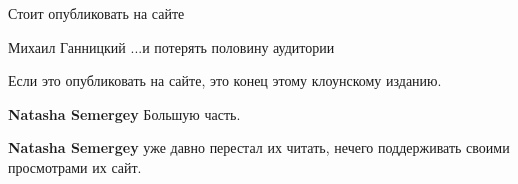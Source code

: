\begin{itemize}
Стоит опубликовать на сайте

\begin{itemize}

 
Михаил Ганницкий ...и потерять половину аудитории

 
Если это опубликовать на сайте, это конец этому клоунскому изданию.

 
\textbf{Natasha Semergey}
Большую часть.

 
\textbf{Natasha Semergey} уже давно перестал их читать, нечего поддерживать своими просмотрами их сайт.
\end{itemize}

\end{itemize}

